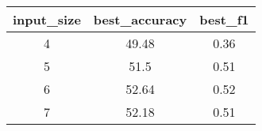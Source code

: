 \begin{tabular}{ccc}
	input\_size & best\_accuracy & best\_f1 \\\hline\hline
	4           & 49.48          & 0.36     \\
	5           & 51.5           & 0.51     \\
	6           & 52.64          & 0.52     \\
	7           & 52.18          & 0.51     \\
\end{tabular}